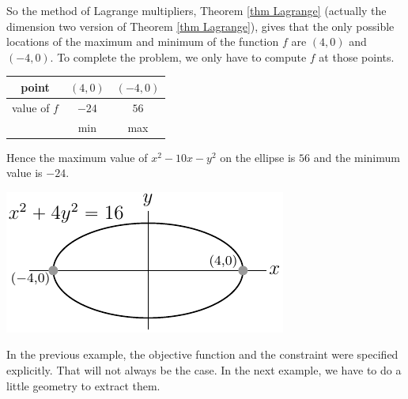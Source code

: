 \begin{eg}
\begin{itemize}
\end{itemize}
So the method of Lagrange multipliers, Theorem \ref{thm Lagrange}
(actually the dimension two version of Theorem \ref{thm Lagrange}), gives
that the only possible locations of the maximum and minimum of the function
$f$ are $(4,0)$ and $(-4,0)$. To complete the problem, we only have to 
compute $f$ at those points.
\begin{center}
\renewcommand{\arraystretch}{1.3}
     \begin{tabular}{|c|c|c|}
     \hline
       point
       &$(4,0)$
       &$(-4,0)$ \\ \hline
       value of $f$
       &$-24$
       &$56$ \\ \hline
       &min 
       &max  \\ \hline
     \end{tabular}
\renewcommand{\arraystretch}{1.0}
\end{center}
Hence the maximum value of $x^2-10x-y^2$ on the ellipse is $56$ 
and the minimum value is $-24$.
\begin{efig}
\begin{center}
   \includegraphics{lagrangeA}
\end{center}
\end{efig}
\end{eg}

In the previous example, the objective function and the constraint were
specified explicitly. That will not always be the case. In the next example,
we have to do a little geometry to extract them.

